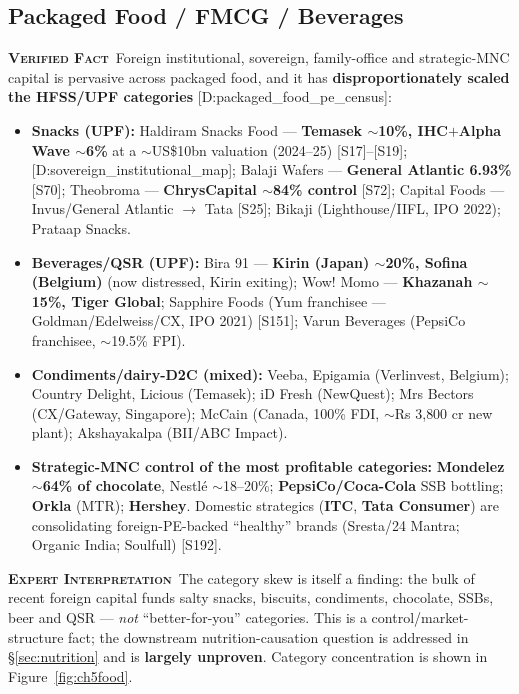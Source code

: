 \documentclass[11pt,a4paper]{article}
\newcommand{\VF}{\textcolor{vfcol}{\textsc{\textbf{Verified Fact}}}}
\newcommand{\EI}{\textcolor{eicol}{\textsc{\textbf{Expert Interpretation}}}}
\newcommand{\cs}[1]{\textnormal{[#1]}}
\begin{document}
\subsection{Packaged Food / FMCG / Beverages}

\VF\ Foreign institutional, sovereign, family-office and strategic-MNC capital is pervasive across packaged food, and it has \textbf{disproportionately scaled the HFSS/UPF categories} \cs{D:packaged\_food\_pe\_census}:
\begin{itemize}[leftmargin=1.4em,itemsep=2pt]
\item \textbf{Snacks (UPF):} Haldiram Snacks Food --- \textbf{Temasek $\sim$10\%, IHC$+$Alpha Wave $\sim$6\%} at a $\sim$US\$10bn valuation (2024--25) \cs{S17}--\cs{S19}; \cs{D:sovereign\_institutional\_map}; Balaji Wafers --- \textbf{General Atlantic 6.93\%} \cs{S70}; Theobroma --- \textbf{ChrysCapital $\sim$84\% control} \cs{S72}; Capital Foods --- Invus/General Atlantic $\rightarrow$ Tata \cs{S25}; Bikaji (Lighthouse/IIFL, IPO 2022); Prataap Snacks.
\item \textbf{Beverages/QSR (UPF):} Bira 91 --- \textbf{Kirin (Japan) $\sim$20\%, Sofina (Belgium)} (now distressed, Kirin exiting); Wow! Momo --- \textbf{Khazanah $\sim$15\%, Tiger Global}; Sapphire Foods (Yum franchisee --- Goldman/Edelweiss/CX, IPO 2021) \cs{S151}; Varun Beverages (PepsiCo franchisee, $\sim$19.5\% FPI).
\item \textbf{Condiments/dairy-D2C (mixed):} Veeba, Epigamia (Verlinvest, Belgium); Country Delight, Licious (Temasek); iD Fresh (NewQuest); Mrs Bectors (CX/Gateway, Singapore); McCain (Canada, 100\% FDI, $\sim$Rs 3{,}800 cr new plant); Akshayakalpa (BII/ABC Impact).
\item \textbf{Strategic-MNC control of the most profitable categories:} \textbf{Mondelez $\sim$64\% of chocolate}, Nestl\'{e} $\sim$18--20\%; \textbf{PepsiCo/Coca-Cola} SSB bottling; \textbf{Orkla} (MTR); \textbf{Hershey}. Domestic strategics (\textbf{ITC}, \textbf{Tata Consumer}) are consolidating foreign-PE-backed ``healthy'' brands (Sresta/24 Mantra; Organic India; Soulfull) \cs{S192}.
\end{itemize}

\EI\ The category skew is itself a finding: the bulk of recent foreign capital funds salty snacks, biscuits, condiments, chocolate, SSBs, beer and QSR --- \emph{not} ``better-for-you'' categories. This is a control/market-structure fact; the downstream nutrition-causation question is addressed in \S\ref{sec:nutrition} and is \textbf{largely unproven}. Category concentration is shown in Figure~\ref{fig:ch5food}.
\end{document}

